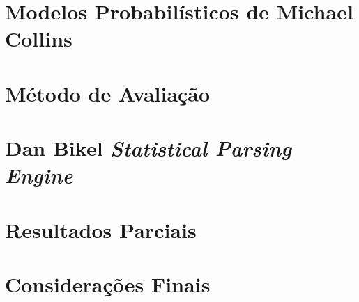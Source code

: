 \documentclass[a4paper]{abnt}
\begin{document}
\chapter{Modelos Probabilísticos de Michael Collins}
\label{cha:michael_collins}
	


\chapter{Método de Avaliação}
\label{cha:avaliacao}
	


\chapter{Dan Bikel \emph{Statistical Parsing Engine}}
\label{cha:dan_bikel1}
	


\chapter{Resultados Parciais}
\label{cha:resultados_parciais}
	


\chapter{Considerações Finais}
\label{cha:consuderacoes_finais}
	



%	

%

\renewcommand{\bibname}{Referência Bibliografia}

\end{document}
